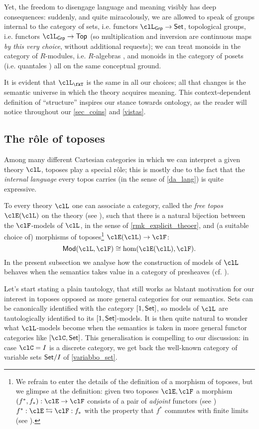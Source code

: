 Yet, the freedom to disengage language and meaning visibly has deep consequences: suddenly, and quite miracolously, we are allowed to speak of groups internal to the category of sets, i.e. functors $\clL_{\cate{Grp}} \to \Set$, topological groups, i.e. functors $\clL_{\cate{Grp}} \to \cate{Top}$ (so multiplication and inversion are continuous maps \emph{by this very choice}, without additional requests); we can treat monoids in the category of $R$-modules, i.e. $R$-algebras \cite[]{}, and monoids in the category of posets \cite{} (i.e. quantales \cite{}) all on the same conceptual ground.

It is evident that $\clL_{\fkT}$ is the same in all our choices; all that changes is the semantic universe in which the theory acquires meaning. This context-dependent definition of ``structure'' inspires our stance towards ontology, as the reader will notice throughout our \autoref{sec_coins} and \autoref{vistas}.

\subsection{The r\^ole of toposes}
Among many different Cartesian categories in which we can interpret a given theory $\clL$, toposes play a special r\^ole; this is mostly due to the fact that the \emph{internal language} every topos carries (in the sense of \autoref{da_lang}) is quite expressive.

To every theory $\clL$ one can associate a category, called the \emph{free topos} $\clE(\clL)$ on the theory (see \cite{lambek1988introduction}), such that there is a natural bijection between the $\clF$-models of $\clL$, in the sense of  \autoref{rmk_explicit_theoer}, and (a suitable choice of) morphisms of toposes\footnote{We refrain to enter the details of the definition of a morphism of toposes, but we glimpse at the definition: given two toposes $\clE,\clF$ a morphism $(f^*,f_*): \clE \to \clF$ consists of a pair of \emph{adjoint} functors (see \cite[3]{Bor1}) $f^*: \clE \leftrightarrows \clF: f_*$ with the property that $f^*$ commutes with finite limits (see \cite[2.8.2]{Bor1}).} $\clE(\clL) \to \clF$:
\[\cate{Mod}(\clL, \clF) \cong \hom(\clE(\clL), \clF).\]
In the present subsection we analyse how the construction of models of $\clL$ behaves when the semantics takes value in a category of presheaves (cf. \cite[??]{Bor1}).

Let's start stating a plain tautology, that still works as blatant motivation for our interest in toposes opposed as more general categories for our semantics. Sets can be canonically identified with the category $[1,\mathsf{Set}]$, so models of $\clL$ are tautologically identified to its $[1,\mathsf{Set}]$-models. It is then quite natural to wonder what $\clL$-models become when the semantics is taken in more general functor categories like $[\clC,\Set]$. This generalisation is compelling to our discussion: in case $\clC=I$ is a discrete category, we get back the well-known category of variable sets $\mathsf{Set}/I$ of \autoref{variabbo_set}.

